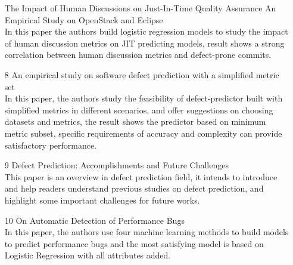 \documentclass[10pt, conference, compsocconf]{IEEEtran}
\begin{document}
\begin{itemize}
	The Impact of Human Discussions on Just-In-Time Quality Assurance An Empirical Study on OpenStack and Eclipse \cite{SANER2016:Tourani}\\
	In this paper the authors build logistic regression models to study the impact of human discussion metrics on JIT predicting models, result shows a strong correlation between human discussion metrics and defect-prone commits.
	\item[8]
	An empirical study on software defect prediction with a simplified metric set \cite{IST2015:He}\\
	In this paper, the authors study the feasibility of defect-predictor built with simplified metrics in different scenarios, and offer suggestions on choosing datasets and metrics, the result shows the predictor based on minimum metric subset, specific requirements of accuracy and complexity can provide satisfactory performance.
	\item[9]
	Defect Prediction: Accomplishments and Future Challenges \cite{SANER2016:Kamei}\\
	This paper is an overview in defect prediction field, it intends to introduce and help readers understand previous studies on defect prediction, and highlight some important challenges for future works.
	\item[10]
	On Automatic Detection of Performance Bugs \cite{ISSREW2016:Tsakiltsidis}\\
	In this paper, the authors use four machine learning methods to build models to predict performance bugs and the most satisfying model is based on Logistic Regression with all attributes added.
\end{itemize}
\end{document}
